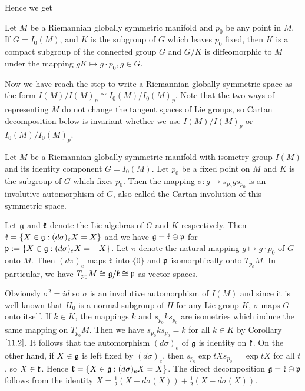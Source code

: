 Hence we get
\begin{corollary}
	Let $M$ be a Riemannian globally symmetric manifold and $p_0$
	be any point in $M$. If $G = I_0(M)$, and $K$ is the subgroup
	of $G$ which leaves $p_0$ fixed, then $K$ is a compact
	subgroup of the connected group $G$ and $G/K$ is
	diffeomorphic to $M$ under the mapping $gK \mapsto g \cdot
	p_0, g \in G$.
\end{corollary}

Now we have reach the step to write a Riemannian globally
symmetric space as the form $I(M)/I(M)_p \cong I_0(M)/I_0(M)_p$.
Note that the two ways of representing $M$ do not change the
tangent spaces of Lie groups, so Cartan decomposition below is
invariant whether we use $I(M)/I(M)_p$ or $ I_0(M)/I_0(M)_p$.

\begin{theorem}
	 Let $M$ be a Riemannian globally symmetric manifold with
	 isometry group $I(M)$ and its identity component $G =
	 I_0(M)$. Let $p_0$ be a fixed point on $M$ and $K$ is the
	 subgroup of $G$ which fixes $p_0$. Then the mapping
	 $\sigma:g\to s_{p_0}gs_{p_0}$ is an involutive automorphism
	 of $G$, also called the Cartan involution of this symmetric
	 space.
	 
	 Let ${\mathfrak g}$ and ${\mathfrak k}$ denote the Lie algebras of $G$ and $K$
	 respectively. Then ${\mathfrak k} = \{ X \in {\mathfrak g}:(d\sigma)_eX = X\}$
	 and  we have ${\mathfrak g} = {\mathfrak k}\oplus{\mathfrak p}$ for ${\mathfrak p}:=\{X\in
	 {\mathfrak g}:(d\sigma)_eX = -X\}$. Let $\pi $ denote the natural
	 mapping $g\mapsto g\cdot p_0$ of $G$ onto $M$. Then
	 $(d\pi)_e$ maps ${\mathfrak k}$ into $\{0\}$ and ${\mathfrak p}$
	 isomorphically onto $T_{p_0}M$. In particular, we have
	 $T_{p_0}M\cong {\mathfrak g}/{\mathfrak k}\cong {\mathfrak p}$ as vector spaces.
\end{theorem}
\bproof
Obviously $\sigma^2 = id$ so $\sigma$ is an involutive
automorphism of $I(M)$ and since it is well known that $H_0$ is a
normal subgroup of $H$ for any Lie group $K$, $\sigma$ maps $G$
onto itself.  If $k\in K$, the mappings $k$ and $s_{p_0}ks_{p_0}$
are isometries which induce the same mapping on $T_{p_0}M$. Then
we have $s_{p_0}ks_{p_0} = k$ for all $k\in K$ by Corollary
$\ref{11.2}$. It follows that the automorphism $(d\sigma)_e$ of
${\mathfrak g}$ is identity on ${\mathfrak k}$. On the other hand, if $X\in {\mathfrak g}$
is left fixed by $(d\sigma)_e$, then $s_{p_0}\exp tX s_{p_0} =
\exp tX$ for all $t$, so $X\in {\mathfrak k}$. Hence ${\mathfrak k} = \{X\in
{\mathfrak g}:(d\sigma)_eX = X\}$.
The direct decomposition ${\mathfrak g} = {\mathfrak k}\oplus{\mathfrak p}$ follows from the
identity $X = \frac{1}{2}(X+d\sigma
(X))+\frac{1}{2}(X-d\sigma(X))$.


